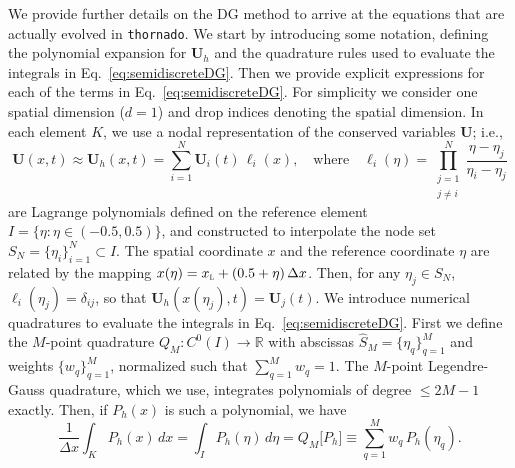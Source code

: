 \documentclass[letterpaper]{jpconf}
\newcommand{\vect}[1]{\boldsymbol{#1}}
\newcommand{\f}[2]{\frac{#1}{#2}}
\newcommand{\dx}{\Delta x}
\newcommand{\xL}{x_{\textnormal{\tiny\textsc{L}}}}
\newcommand{\thornado}{\texttt{thornado}}
\begin{document}
We provide further details on the DG method to arrive at the equations that are actually evolved in \thornado.  
We start by introducing some notation, defining the polynomial expansion for $\vect{U}_{h}$ and the quadrature rules used to evaluate the integrals in Eq.~\eqref{eq:semidiscreteDG}.  
Then we provide explicit expressions for each of the terms in Eq.~\eqref{eq:semidiscreteDG}.  
For simplicity we consider one spatial dimension ($d=1$) and drop indices denoting the spatial dimension.  
In each element $K$, we use a nodal representation of the conserved variables $\vect{U}$; i.e.,
\begin{equation}
  \vect{U}(x,t)\approx
  \vect{U}_{h}(x,t)=\sum_{i=1}^{N}\vect{U}_{i}(t)\,\ell_{i}(x),
  \quad\text{where}\quad
  \ell_{i}(\eta)=
  \prod_{\substack{j=1\\j\ne i}}^{N}\f{\eta-\eta_{j}}{\eta_{i}-\eta_{j}}
  \label{eq:conservedNodalExpansion}
\end{equation}
are Lagrange polynomials defined on the reference element $I = \{ \eta : \eta \in (-0.5,0.5) \}$, and constructed to interpolate the node set $S_{N}=\{\eta_{i}\}_{i=1}^{N}\subset I$.  
The spatial coordinate $x$ and the reference coordinate $\eta$ are related by the mapping $x(\eta)=\xL+(0.5+\eta)\,\dx$.  
Then, for any $\eta_{j}\in S_{N}$, $\ell_{i}(\eta_{j})=\delta_{ij}$, so that $\vect{U}_{h}(x(\eta_{j}),t)=\vect{U}_{j}(t)$.  
We introduce numerical quadratures to evaluate the integrals in Eq.~\eqref{eq:semidiscreteDG}.  
First we define the $M$-point quadrature $Q_{M}:C^{0}(I)\to\mathbb{R}$ with abscissas $\hat{S}_{M}=\{\eta_{q}\}_{q=1}^{M}$ and weights $\{w_{q}\}_{q=1}^{M}$, normalized such that $\sum_{q=1}^{M}w_{q}=1$.  
The $M$-point Legendre-Gauss quadrature, which we use, integrates polynomials of degree $\le 2M-1$ exactly.  
Then, if $P_{h}(x)$ is such a polynomial, we have
\begin{equation}
  \f{1}{\dx}\int_{K}P_{h}(x)\,dx=\int_{I}P_{h}(\eta)\,d\eta=Q_{M}\big[P_{h}\big]\equiv\sum_{q=1}^{M}w_{q}\,P_{h}(\eta_{q}).  
\end{equation}
\end{document}
